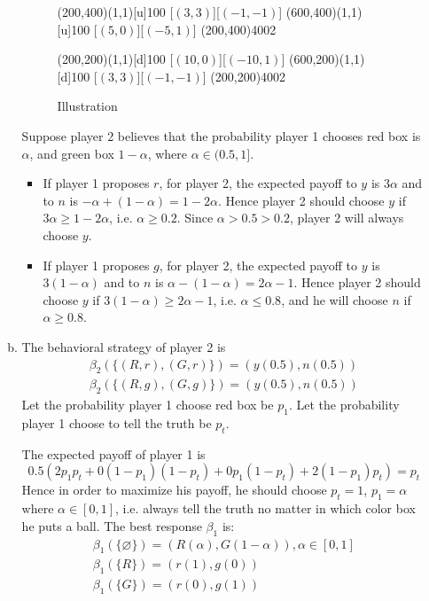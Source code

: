 \documentclass[a4paper,12pt]{article}
\begin{document}
\begin{enumerate}
\begin{enumerate}[(a)]
\begin{figure}[!htb]
{\begin{egame}
        \putbranch(200,400)(1,1)[u]{100}
        [$(3,3)$][$(-1,-1)$]
        \putbranch(600,400)(1,1)[u]{100}
        [$(5,0)$][$(-5,1)$]
        \infoset(200,400){400}{2}

        \putbranch(200,200)(1,1)[d]{100}
        [$(10,0)$][$(-10,1)$]
        \putbranch(600,200)(1,1)[d]{100}
        [$(3,3)$][$(-1,-1)$]
        \infoset(200,200){400}{2}
    \end{egame}
}%

\caption{Illustration}\label{fig:1}
\end{figure}

Suppose player 2 believes that the probability player 1 chooses red box is $\alpha$,
and green box $1-\alpha$, where $\alpha \in (0.5,1]$.
    \begin{itemize}
    \item If player 1 proposes $r$,
          for player 2, the expected payoff to $y$ is $3\alpha$ and to $n$ is
          $-\alpha+(1-\alpha)=1-2\alpha$.
          Hence player 2 should choose $y$ if $3\alpha \ge 1-2\alpha$, i.e. $\alpha \ge 0.2$.
          Since $\alpha > 0.5 > 0.2$, player 2 will always choose $y$.
    \item If player 1 proposes $g$,
          for player 2, the expected payoff to $y$ is $3(1-\alpha)$ and to $n$ is
          $\alpha-(1-\alpha)=2\alpha-1$.
          Hence player 2 should choose $y$ if $3(1-\alpha) \ge 2\alpha-1$, i.e. $\alpha \le 0.8$,
          and he will choose $n$ if $\alpha \ge 0.8$.
    \end{itemize}

\item
The behavioral strategy of player 2 is
    \begin{displaymath}
    \begin{array}{l}
        \beta_2(\{(R,r),(G,r)\})=(y(0.5),n(0.5))\\
        \beta_2(\{(R,g),(G,g)\})=(y(0.5),n(0.5))
    \end{array}
    \end{displaymath}
Let the probability player 1 choose red box be $p_1$.
Let the probability player 1 choose to tell the truth be $p_t$.

The expected payoff of player 1 is
    \begin{displaymath}
    0.5(2p_1p_t+0(1-p_1)(1-p_t)+0p_1(1-p_t)+2(1-p_1)p_t)=p_t
    \end{displaymath}
Hence in order to maximize his payoff, he should choose $p_t=1$, $p_1=\alpha$ where $\alpha \in [0,1]$,
 i.e. always tell the truth no matter in which color box he puts a ball.
The best response $\beta_1$ is:
    \begin{displaymath}
    \begin{array}{l}
        \beta_1(\{\varnothing\})=(R(\alpha),G(1-\alpha)), \alpha \in [0,1]\\
        \beta_1(\{R\})=(r(1),g(0))\\
        \beta_1(\{G\})=(r(0),g(1))
    \end{array}
    \end{displaymath}


\end{enumerate}
\end{enumerate}
\end{document}
